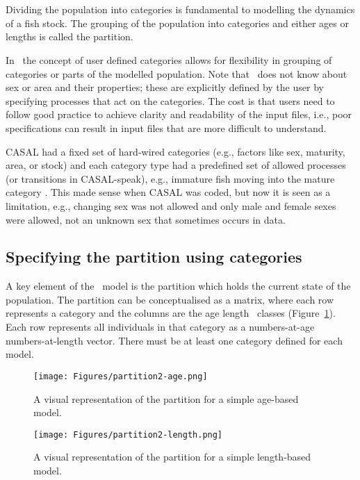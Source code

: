 \section{\label{sec:PartitionCategories}}

Dividing the population into categories is fundamental to modelling the dynamics of a fish stock. The grouping of the population into categories and either ages or lengths is called the partition. 

In \CNAME\, the concept of user defined categories allows for flexibility in grouping of categories or parts of the modelled population. Note that \CNAME\ does not know about sex or area and their properties; these are explicitly defined by the user by specifying processes that act on the categories. The cost is that users need to follow good practice to achieve clarity and readability of the input files, i.e., poor specifications can result in input files that are more difficult to understand.

CASAL had a fixed set of hard-wired categories (e.g., factors like sex, maturity, area, or stock) and each category type had a predefined set of allowed processes (or transitions in CASAL-speak), e.g., immature fish moving into the mature category \citep{1388}. This made sense when CASAL was coded, but now it is seen as a limitation, e.g., changing sex was not allowed and only male and female sexes were allowed, not an unknown sex that sometimes occurs in data. 

\subsection{Specifying the partition using categories}

A key element of the \CNAME\ model is the partition which holds the current state of the population. The partition can be conceptualised as a matrix, where each row represents a category and the columns are the \ifAgeBased age \else length \fi \ classes (Figure~\ref{Fig:part}). Each row represents all individuals in that category as a \ifAgeBased numbers-at-age \else numbers-at-length \fi vector.  There must be at least one category defined for each model.

\begin{figure}[H]
	\centering
	\ifAgeBased
	\texttt{[image: Figures/partition2-age.png]}
	\caption{A visual representation of the partition for a simple age-based model.}
	\else
	\texttt{[image: Figures/partition2-length.png]}
	\caption{A visual representation of the partition for a simple length-based model.}
	\fi
    \label{Fig:part}
\end{figure}

